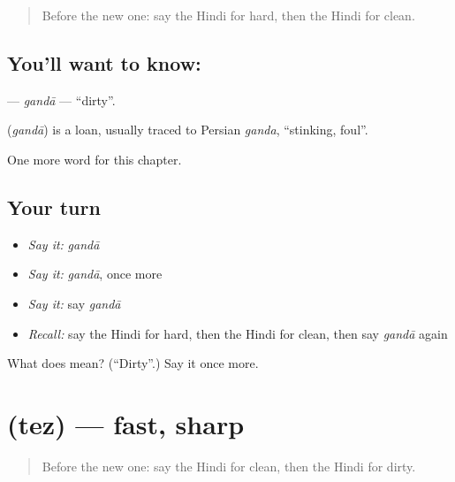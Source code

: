 \label{lesson:HI-C155-ganda}



\begin{quote}
Before the new one: say the Hindi for hard, then the Hindi for clean.
\end{quote}

\subsection*{You'll want to know: }
\textbf{} — \emph{gandā} — \textquotedblleft{}dirty\textquotedblright{}.

\begin{cousinweb}
\textbf{} (\emph{gandā}) is a loan, usually traced to Persian \emph{ganda}, \textquotedblleft{}stinking, foul\textquotedblright{}.
\end{cousinweb}

\begin{grammarlens}[title={What you've built}]
One more word for this chapter.
\end{grammarlens}

\subsection*{Your turn}
\begin{itemize}
\raggedright
  \item \emph{Say it:} \emph{gandā}
  \item \emph{Say it:} \emph{gandā}, once more
  \item \emph{Say it:} say \emph{gandā}
  \item \emph{Recall:} say the Hindi for hard, then the Hindi for clean, then say \emph{gandā} again
\end{itemize}

\begin{tcolorbox}[breakable,colback=teal!4,colframe=teal!35!black,title={Before you move on}]
What does  mean? (\textquotedblleft{}Dirty\textquotedblright{}.) Say it once more.
\end{tcolorbox}
\section[\texorpdfstring{\hi{तेज़} (tez)}{तेज़ (tez)}]{ (tez) — fast, sharp}

\label{lesson:HI-C155-tez}



\begin{quote}
Before the new one: say the Hindi for clean, then the Hindi for dirty.
\end{quote}

